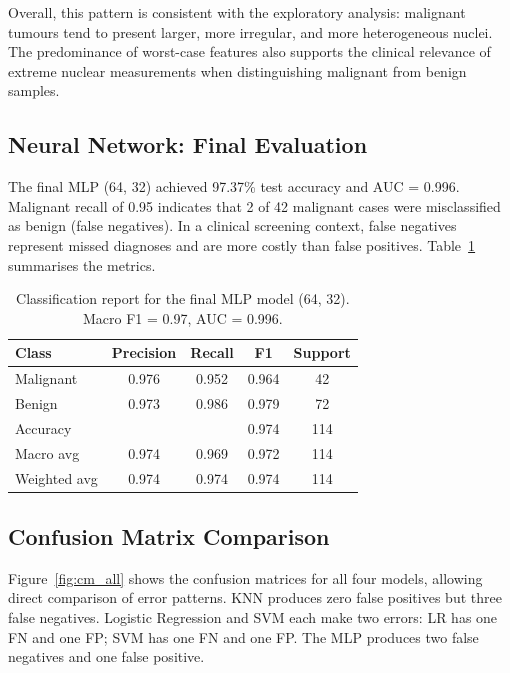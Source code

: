 \documentclass[twocolumn, fontsize=10pt]{article}
\begin{document}
Overall, this pattern is consistent with the exploratory analysis: malignant tumours tend to present larger, more irregular, and more heterogeneous nuclei. The predominance of worst-case features also supports the clinical relevance of extreme nuclear measurements when distinguishing malignant from benign samples.


\subsection{Neural Network: Final Evaluation}

The final MLP (64, 32) achieved 97.37\% test accuracy and AUC = 0.996. Malignant recall of 0.95 indicates that 2 of 42 malignant cases were misclassified as benign (false negatives). In a clinical screening context, false negatives represent missed diagnoses and are more costly than false positives. Table~\ref{tab:mlp_report} summarises the metrics.

\begin{table}[H]
\centering
\small
\setlength{\tabcolsep}{4pt}
\begin{tabular}{lcccc}
\toprule
\textbf{Class} & \textbf{Precision} & \textbf{Recall} & \textbf{F1} & \textbf{Support} \\
\midrule
Malignant    & 0.976 & 0.952 & 0.964 & 42 \\
Benign       & 0.973 & 0.986 & 0.979 & 72 \\
\midrule
Accuracy     & &  & {0.974} & 114 \\
Macro avg    & 0.974 & 0.969 & 0.972 & 114 \\
Weighted avg & 0.974 & 0.974 & 0.974 & 114 \\
\bottomrule
\end{tabular}
\caption{Classification report for the final MLP model (64, 32). Macro F1 = 0.97, AUC = 0.996.}
\label{tab:mlp_report}
\end{table}

\subsection{Confusion Matrix Comparison}

Figure~\ref{fig:cm_all} shows the confusion matrices for all four models, allowing direct comparison of error patterns. KNN produces zero false positives but three false negatives. Logistic Regression and SVM each make two errors: LR has one FN and one FP; SVM has one FN and one FP. The MLP produces two false negatives and one false positive.
\end{document}
